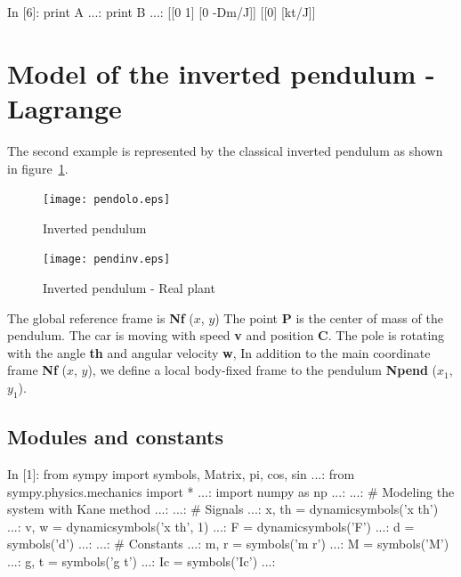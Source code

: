 \begin{code}
In [6]: print A
   ...: print B
   ...: 
[[0 1]
 [0 -Dm/J]]
[[0]
 [kt/J]]
\end{code}


\section{Model of the inverted pendulum - Lagrange}

The second example is represented by the classical inverted pendulum as shown 
in figure~\ref{F9a}.

\begin{figure}[htbp]	%
\centering
\vspace{8mm}
\texttt{[image: pendolo.eps]}
\caption{Inverted pendulum}
\label{F9a}
\vspace{8mm}
\end{figure}

\begin{figure}[htbp]	%
\centering
\vspace{8mm}
\texttt{[image: pendinv.eps]}
\caption{Inverted pendulum - Real plant}
\label{F9_a}
\vspace{8mm}
\end{figure}

The global reference frame is \textbf{Nf} ($x$, $y$)
The point \textbf{P} is the center of mass of the pendulum. The car is moving 
with speed \textbf{v} and position \textbf{C}.
The pole is rotating with the angle \textbf{th} and angular velocity 
\textbf{w}, 
In addition to the main coordinate frame \textbf{Nf} ($x$, $y$), we define a 
local body-fixed frame to the pendulum \textbf{Npend} ($x_1$, $y_1$).

\subsection{Modules and constants}
\begin{code}
In [1]: from sympy import symbols, Matrix, pi, cos, sin
   ...: from sympy.physics.mechanics import *
   ...: import numpy as np
   ...: 
   ...: # Modeling the system with Kane method
   ...: 
   ...: # Signals
   ...: x, th  = dynamicsymbols('x th')
   ...: v, w = dynamicsymbols('x th', 1)
   ...: F = dynamicsymbols('F')
   ...: d = symbols('d')
   ...: 
   ...: # Constants
   ...: m, r = symbols('m r')
   ...: M = symbols('M')
   ...: g, t = symbols('g t')
   ...: Ic = symbols('Ic')
   ...: 
\end{code}

